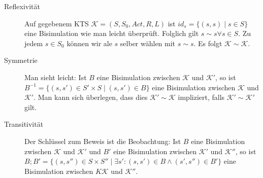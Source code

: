 \begin{beweis}
	\mbox{}
	\begin{description}
		\item[Reflexivität] Auf gegebenem KTS $\mathcal{K} = (S, S_0, Act, R, L)$ ist $id_s = \{(s,s) \mid s \in S\}$ eine Bisimulation wie man leicht überprüft. Folglich gilt $s \sim s \forall s \in S$. Zu jedem $s \in S_0$ können wir ale $s$ selber wählen mit $s \sim s$. Es folgt $\mathcal{K} \sim \mathcal{K}$.
		
		\item[Symmetrie] Man sieht leicht: Ist $B$ eine Bisimulation zwischen $\mathcal{K}$ und $\mathcal{K'}$, so ist $B^{-1} = \{(s,s')\in S' \times S \mid (s, s') \in B \}$ eine Bisimulation zwischen $\mathcal{K}$ und $\mathcal{K'}$. Man kann sich überlegen, dass dies $\mathcal{K'} \sim \mathcal{K}$ impliziert, falls $\mathcal{K'} \sim \mathcal{K'}$ gilt.
		
		\item[Transitivität] Der Schlüssel zum Beweis ist die Beobachtung: Ist $B$ eine Bisimulation zwischen $\mathcal{K}$ und $\mathcal{K'}$ und $B'$ eine Bisimulation zwischen $\mathcal{K'}$ und $\mathcal{K''}$, so ist $B;B' = \{(s, s'') \in S \times S'' \mid \exists s': (s, s') \in B \wedge (s', s'') \in B'\}$ eine Bisimulation zwischen $K\mathcal{K}$ und $\mathcal{K''}$.
	\end{description}
\end{beweis}
\cleardoubleoddemptypage